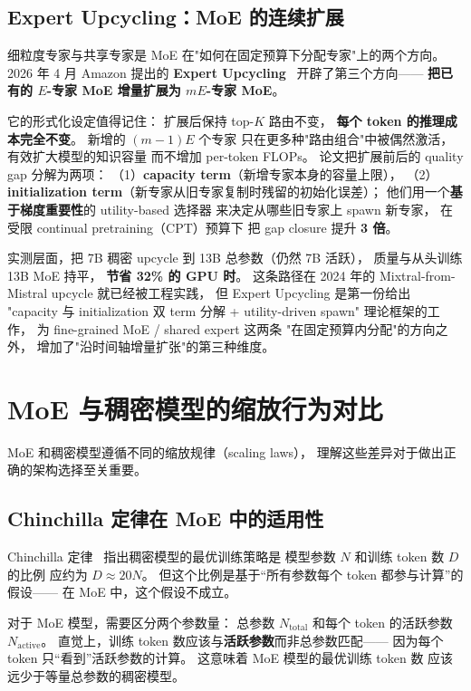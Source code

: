 \subsection{Expert Upcycling：MoE 的连续扩展}
\label{sec:expert-upcycling}

细粒度专家与共享专家是 MoE 在"如何在固定预算下分配专家"上的两个方向。
2026 年 4 月 Amazon 提出的
\textbf{Expert Upcycling}~\cite{expertUpcycling2026}
开辟了第三个方向——
\textbf{把已有的 $E$-专家 MoE 增量扩展为 $mE$-专家 MoE}。

它的形式化设定值得记住：
扩展后保持 top-$K$ 路由不变，
\textbf{每个 token 的推理成本完全不变}。
新增的 $(m-1)E$ 个专家
只在更多种"路由组合"中被偶然激活，
有效扩大模型的知识容量
而不增加 per-token FLOPs。
论文把扩展前后的 quality gap
分解为两项：
（1）\textbf{capacity term}（新增专家本身的容量上限），
（2）\textbf{initialization term}（新专家从旧专家复制时残留的初始化误差）；
他们用一个\textbf{基于梯度重要性}的 utility-based 选择器
来决定从哪些旧专家上 spawn 新专家，
在受限 continual pretraining（CPT）预算下
把 gap closure 提升 \textbf{3 倍}。

实测层面，把 7B 稠密 upcycle 到 13B 总参数（仍然 7B 活跃），
质量与从头训练 13B MoE 持平，
\textbf{节省 32\% 的 GPU 时}。
这条路径在 2024 年的 Mixtral-from-Mistral upcycle
就已经被工程实践，
但 Expert Upcycling 是第一份给出
"capacity 与 initialization 双 term 分解 + utility-driven spawn"
理论框架的工作，
为 fine-grained MoE / shared expert 这两条
"在固定预算内分配"的方向之外，
增加了"沿时间轴增量扩张"的第三种维度。

\section{MoE 与稠密模型的缩放行为对比}
\label{sec:moe-scaling-comparison}

MoE 和稠密模型遵循不同的缩放规律（scaling laws），
理解这些差异对于做出正确的架构选择至关重要。

\subsection{Chinchilla 定律在 MoE 中的适用性}

Chinchilla 定律~\cite{hoffmann2022chinchilla}
指出稠密模型的最优训练策略是
模型参数 $N$ 和训练 token 数 $D$ 的比例
应约为 $D \approx 20N$。
但这个比例是基于“所有参数每个 token 都参与计算”的假设——
在 MoE 中，这个假设不成立。

对于 MoE 模型，需要区分两个参数量：
总参数 $N_{\text{total}}$ 和每个 token 的活跃参数 $N_{\text{active}}$。
直觉上，训练 token 数应该与\textbf{活跃参数}而非总参数匹配——
因为每个 token 只“看到”活跃参数的计算。
这意味着 MoE 模型的最优训练 token 数
应该远少于等量总参数的稠密模型。

